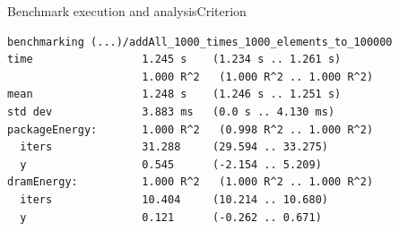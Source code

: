     \begin{frame}[fragile]{Benchmark execution and analysis}{Criterion}

        \begin{verbatim}
benchmarking (...)/addAll_1000_times_1000_elements_to_100000
time                 1.245 s    (1.234 s .. 1.261 s)
                     1.000 R^2   (1.000 R^2 .. 1.000 R^2)
mean                 1.248 s    (1.246 s .. 1.251 s)
std dev              3.883 ms   (0.0 s .. 4.130 ms)
packageEnergy:       1.000 R^2   (0.998 R^2 .. 1.000 R^2)
  iters              31.288     (29.594 .. 33.275)
  y                  0.545      (-2.154 .. 5.209)
dramEnergy:          1.000 R^2   (1.000 R^2 .. 1.000 R^2)
  iters              10.404     (10.214 .. 10.680)
  y                  0.121      (-0.262 .. 0.671)
        \end{verbatim}


    \end{frame}







